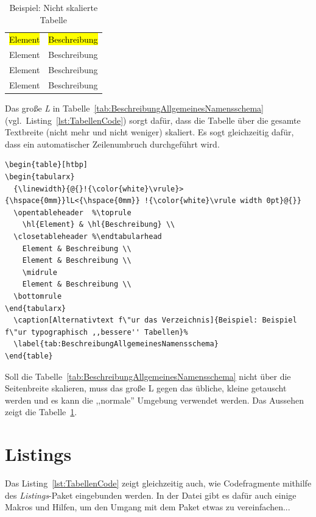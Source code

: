 \begin{table}[!ht]
\begin{center}
\begin{tabular} {ll}
	\opentableheader	%
		\hl{Element} & \hl{Beschreibung} \\
	\closetableheader %
		Element & Beschreibung \\
		Element & Beschreibung \\
		\midrule
		Element & Beschreibung \\
	\bottomrule
\end{tabular}
\end{center}
  \caption{Beispiel: Nicht skalierte Tabelle}%
  \label{tab:TabUnskaliert}
\end{table}

Das gro{\ss}e \emph{L} in Tabelle~\ref{tab:BeschreibungAllgemeinesNamensschema} (vgl.\ Listing~\ref{lst:TabellenCode}) sorgt daf\"ur, dass die Tabelle \"uber die gesamte Textbreite (nicht mehr und nicht weniger) skaliert. Es sogt gleichzeitig daf\"ur, dass ein automatischer Zeilenumbruch durchgef\"uhrt wird.

\begin{lstlisting}[captionpos=b, caption=Listing f\"ur die oben stehende Tabelle,label=lst:TabellenCode]
\begin{table}[htbp]
\begin{tabularx}
  {\linewidth}{@{}!{\color{white}\vrule}>{\hspace{0mm}}lL<{\hspace{0mm}} !{\color{white}\vrule width 0pt}@{}}
  \opentableheader	%\toprule
	\hl{Element} & \hl{Beschreibung} \\
  \closetableheader %\endtabularhead
	Element & Beschreibung \\
	Element & Beschreibung \\
	\midrule
	Element & Beschreibung \\
  \bottomrule
\end{tabularx}
  \caption[Alternativtext f\"ur das Verzeichnis]{Beispiel: Beispiel f\"ur typographisch ,,bessere'' Tabellen}%
  \label{tab:BeschreibungAllgemeinesNamensschema}
\end{table}
\end{lstlisting}

Soll die Tabelle~\ref{tab:BeschreibungAllgemeinesNamensschema} nicht \"uber die Seitenbreite skalieren, muss das gro{\ss}e L gegen das \"ubliche, kleine getauscht werden und es kann die ,,normale'' Umgebung  verwendet werden. Das Aussehen zeigt die Tabelle~\ref{tab:TabUnskaliert}.

\section{Listings}
\label{sec:2:Listings}
Das Listing~\ref{lst:TabellenCode} zeigt gleichzeitig auch, wie Codefragmente mithilfe des \emph{Listings}-Paket eingebunden werden. In der Datei  gibt es daf\"ur auch einige Makros und Hilfen, um den Umgang mit dem Paket etwas zu vereinfachen...


